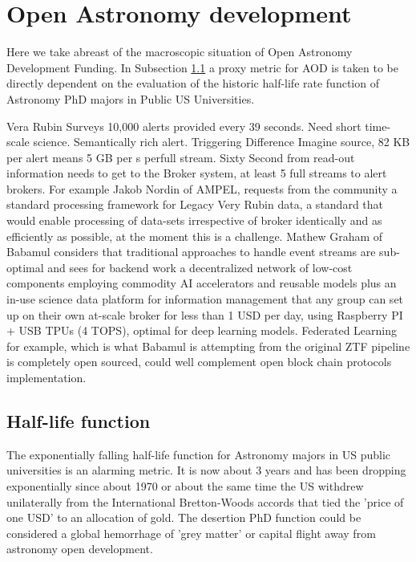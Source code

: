 \documentclass[final,5p,times,twocolumn,authoryear]{elsarticle}
\begin{document}
\section{Open Astronomy development}
\label{sec:btc2}

Here we take abreast of the macroscopic situation of Open Astronomy Development Funding. In Subsection \ref{btc2:sec:sub:half} a proxy metric for AOD is taken to be directly dependent on the evaluation of the historic half-life rate function of Astronomy PhD majors in Public US Universities. 

Vera Rubin Surveys 10,000 alerts provided every 39 seconds. Need short time-scale science. Semantically rich alert. Triggering Difference Imagine source, 82 KB per alert means 5 GB per s perfull stream. Sixty Second from read-out information needs to get to the Broker system, at least 5 full streams to alert brokers.   For example  Jakob Nordin of AMPEL, requests from the community a standard processing framework for Legacy Very Rubin data, a standard that would enable processing of data-sets irrespective of broker identically and as efficiently as possible, at the moment this is a challenge.  Mathew Graham of Babamul considers that traditional approaches to handle event streams are sub-optimal and sees for backend work a decentralized network of low-cost components employing commodity AI accelerators and reusable models plus an in-use science data platform for information management that any group can set up on their own at-scale broker for less than 1 USD per day, using Raspberry PI + USB TPUs (4 TOPS), optimal for deep learning models.  Federated Learning for example, which is what Babamul is attempting from the original ZTF pipeline is completely open sourced, could well complement open block chain protocols implementation.  

\subsection{Half-life function}
\label{btc2:sec:sub:half}

The exponentially falling half-life function for Astronomy majors in US public universities is an alarming metric. It is now about 3 years and has been dropping exponentially since about 1970 or about the same time the US withdrew unilaterally from the International Bretton-Woods accords that tied the 'price of one USD' to an allocation of gold. The desertion PhD function could be considered a global hemorrhage of 'grey matter' or capital flight away from astronomy open development.
\end{document}
